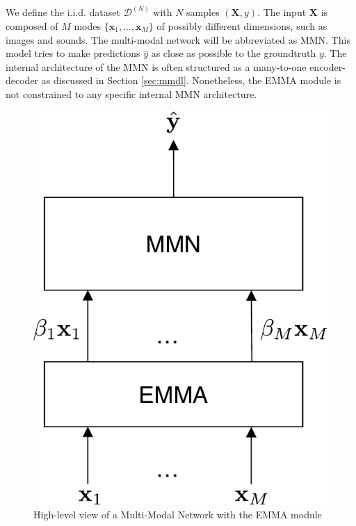 We define the i.i.d. dataset $\mathcal{D}^{(N)}$ with $N$ samples  $(\mathbf{X},y)$. The input $\textbf{X}$ is composed of $M$ modes $\{\mathbf{x}_1, \ldots, \mathbf{x}_M\}$ of possibly different dimensions, such as images and sounds. The multi-modal network will be abbreviated as MMN. This model tries to make predictions $\hat{y}$ as close as possible to the groundtruth $y$. The internal architecture of the MMN is often structured as a many-to-one encoder-decoder as discussed in Section \ref{sec:mmdl}. Nonetheless, the EMMA module is not constrained to any specific internal MMN architecture.
\begin{figure}[!h]
\centering
\includegraphics[scale=0.5]{figures/mlp-with-emma}
\caption[High-level view of a Multi-Modal Network with EMMA]{High-level view of a Multi-Modal Network with the EMMA module}	
\label{fig:mnn-with-emma}
\end{figure}

